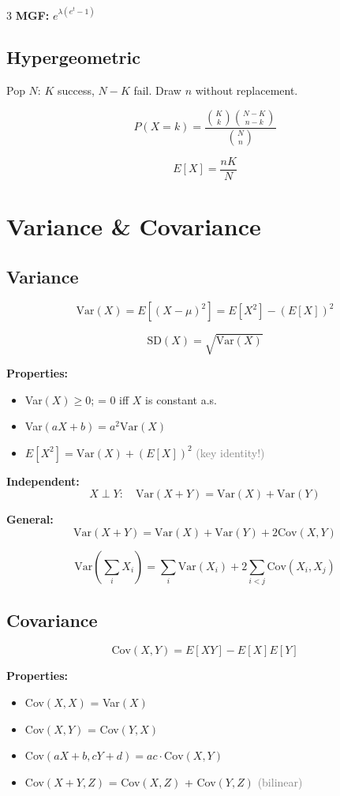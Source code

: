 \documentclass[10pt,landscape]{article}
\newcommand{\note}[1]{\textcolor{gray}{\small(#1)}}
\begin{document}
\begin{multicols}{3}
\textbf{MGF:} $e^{\lambda(e^t - 1)}$

\subsection{Hypergeometric}
Pop $N$: $K$ success, $N - K$ fail. Draw $n$ without replacement.

$$P(X = k) = \frac{\binom{K}{k}\binom{N-K}{n-k}}{\binom{N}{n}}$$

$$E[X] = \frac{nK}{N}$$

\section{Variance \& Covariance}

\subsection{Variance}
$$\text{Var}(X) = E[(X - \mu)^2] = E[X^2] - (E[X])^2$$

$$\text{SD}(X) = \sqrt{\text{Var}(X)}$$

\textbf{Properties:}
\begin{itemize}[leftmargin=*,noitemsep]
\item Var$(X) \geq 0$; = 0 iff $X$ is constant a.s.
\item Var$(aX + b) = a^2 \text{Var}(X)$
\item $E[X^2] = \text{Var}(X) + (E[X])^2$ \note{key identity!}
\end{itemize}

\textbf{Independent:}
$$X \perp Y: \quad \text{Var}(X + Y) = \text{Var}(X) + \text{Var}(Y)$$

\textbf{General:}
$$\text{Var}(X + Y) = \text{Var}(X) + \text{Var}(Y) + 2\text{Cov}(X, Y)$$

$$\text{Var}\left(\sum_i X_i\right) = \sum_i \text{Var}(X_i) + 2\sum_{i<j} \text{Cov}(X_i, X_j)$$

\subsection{Covariance}
$$\text{Cov}(X, Y) = E[XY] - E[X]E[Y]$$

\textbf{Properties:}
\begin{itemize}[leftmargin=*,noitemsep]
\item Cov$(X, X)$ = Var$(X)$
\item Cov$(X, Y)$ = Cov$(Y, X)$
\item Cov$(aX + b, cY + d) = ac \cdot \text{Cov}(X, Y)$
\item Cov$(X + Y, Z)$ = Cov$(X, Z)$ + Cov$(Y, Z)$ \note{bilinear}
\end{itemize}


\end{multicols}
\end{document}
